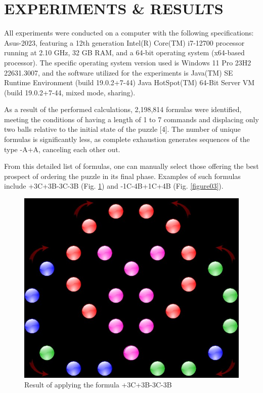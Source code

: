 \documentclass[a4paper,twocolumn,10pt]{article}
\begin{document}
\section{EXPERIMENTS \& RESULTS}

All experiments were conducted on a computer with the following specifications: Asus-2023, featuring a 12th generation Intel(R) Core(TM) i7-12700 processor running at 2.10 GHz, 32 GB RAM, and a 64-bit operating system (x64-based processor). The specific operating system version used is Windows 11 Pro 23H2 22631.3007, and the software utilized for the experiments is Java(TM) SE Runtime Environment (build 19.0.2+7-44) Java HotSpot(TM) 64-Bit Server VM (build 19.0.2+7-44, mixed mode, sharing).

As a result of the performed calculations, 2,198,814 formulas were identified, meeting the conditions of having a length of 1 to 7 commands and displacing only two balls relative to the initial state of the puzzle [4]. The number of unique formulas is significantly less, as complete exhaustion generates sequences of the type -A+A, canceling each other out.

From this detailed list of formulas, one can manually select those offering the best prospect of ordering the puzzle in its final phase. Examples of such formulas include +3C+3B-3C-3B (Fig. \ref{figure02}) and -1C-4B+1C+4B (Fig. \ref{figure03}).

\begin{figure}
	\centering
	\includegraphics[width=1.0\linewidth]{figure02.png}
	\caption{Result of applying the formula +3C+3B-3C-3B}
	\label{figure02}
\end{figure}
\end{document}
